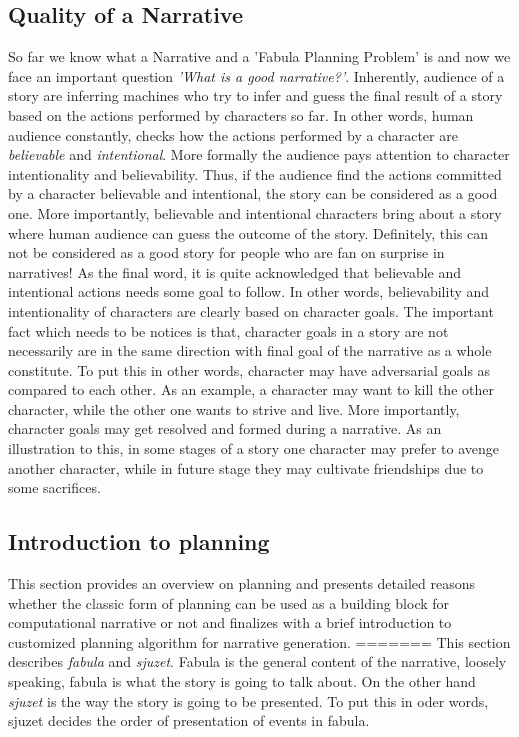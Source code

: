 \documentclass[english]{tktltiki}
\begin{document}
\subsection{Quality of a Narrative}
So far we know what a Narrative and a 'Fabula Planning Problem' is and now we face an important question \textit{'What is a good narrative?'}. \newline
Inherently, audience of a story are inferring machines who try to infer and guess the final result of a story based on the actions performed by characters so far. In other words, human audience constantly, checks how the actions performed by a character are\textit{ believable} and \textit{intentional}. More formally the audience pays attention to character intentionality and believability. Thus, if the audience find the actions committed by a character believable and intentional, the story can be considered as a good one. More importantly, believable and intentional characters bring about a story where human audience can guess the outcome of the story. Definitely, this can not be considered as a good story for people who are fan on surprise in narratives!
As the final word, it is quite acknowledged that believable and intentional actions needs some goal to follow. In other words, believability and intentionality of characters are clearly based on character goals. The important fact which needs to be notices is that, character goals in a story are not necessarily are in the same direction with final goal of the narrative as a whole constitute. To put this in other words, character may have adversarial goals as compared to each other. As an example, a character may want to kill the other character, while the other one wants to strive and live. More importantly, character goals may get resolved and formed during a narrative. As an illustration to this, in some stages of a story one character may prefer to avenge another character, while in future stage they may cultivate friendships due to some sacrifices. 
\subsection{Introduction to planning}
This section provides an overview on planning and presents detailed reasons whether the classic form of planning can be used as a building block for computational narrative or not and finalizes with a brief introduction to customized planning algorithm for narrative generation.\newline 
=======
This section describes \textit{fabula} and \textit{sjuzet}.
Fabula is the general content of the narrative, loosely speaking, fabula is what the story is going to talk about. On the other hand \textit{sjuzet} is the way the story is going to be presented. To put this in oder words, sjuzet decides the order of presentation of events in fabula.
\end{document}
